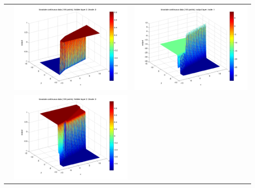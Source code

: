 \documentclass[fleqn]{article}
\begin{document}
\begin{center}
\begin{longtable}{ c | c | r }
     																		&   \includegraphics[scale=0.25]{./pics/bivariate100/_2_4/_2_4_epoch_1_hidden layer 2 :22}  & \includegraphics[scale=0.25]{./pics/bivariate100/_2_4/_2_4_epoch_1_output layer :1}  \\ 
     																		&   \includegraphics[scale=0.25]{./pics/bivariate100/_2_4/_2_4_epoch_1_hidden layer 2 :23} &  \\

\end{longtable}
\end{center}
\end{document}
